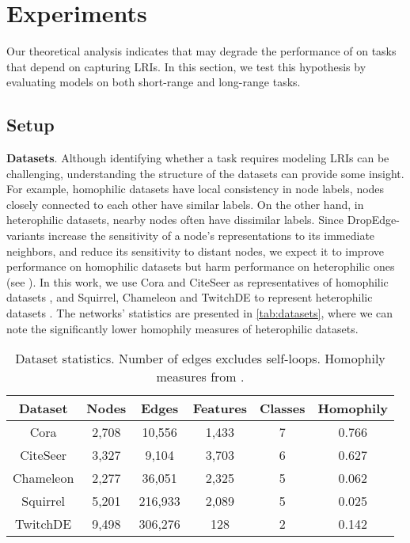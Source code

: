 \section{Experiments}
\label{sec:exp}

Our theoretical analysis indicates that  may degrade the performance of  on tasks that depend on capturing LRIs. In this section, we test this hypothesis by evaluating  models on both short-range and long-range tasks.

\subsection{Setup}

\textbf{Datasets}. Although identifying whether a task requires modeling LRIs can be challenging, understanding the structure of the datasets can provide some insight. For example, homophilic datasets have local consistency in node labels, \ie nodes closely connected to each other have similar labels. On the other hand, in heterophilic datasets, nearby nodes often have dissimilar labels. Since DropEdge-variants increase the sensitivity of a node's representations to its immediate neighbors, and reduce its sensitivity to distant nodes, we expect it to improve performance on homophilic datasets but harm performance on heterophilic ones (see \citet{topping2022understanding}). In this work, we use Cora \citep{mccallum2000cora} and CiteSeer \citep{giles1998citeseer} as representatives of homophilic datasets \citep{zhu2020heterophily}, and Squirrel, Chameleon and TwitchDE \citep{musae} to represent heterophilic datasets \citep{lim2021new}. The networks' statistics are presented in \autoref{tab:datasets}, where we can note the significantly lower homophily measures of heterophilic datasets.

\begin{table}[t]
    \centering
    \renewcommand{\arraystretch}{1.3}
    \begin{tabular}{|c|c|c|c|c|c|}
        \hline
        \textbf{Dataset} & \textbf{Nodes} & \textbf{Edges} & \textbf{Features} & \textbf{Classes} & \textbf{Homophily} \\ \hline
        Cora & 2,708 & 10,556 & 1,433 & 7 & 0.766 \\ \hline
        CiteSeer & 3,327 & 9,104 & 3,703 & 6 & 0.627 \\ \hline
        Chameleon & 2,277 & 36,051 & 2,325 & 5 & 0.062 \\ \hline
        Squirrel & 5,201 & 216,933 & 2,089 & 5 & 0.025 \\ \hline
        TwitchDE & 9,498 & 306,276 & 128 & 2 & 0.142 \\ \hline
    \end{tabular}
    \caption{Dataset statistics. Number of edges excludes self-loops. Homophily measures from \cite{lim2021new}.}
    \label{tab:datasets}
\end{table}

